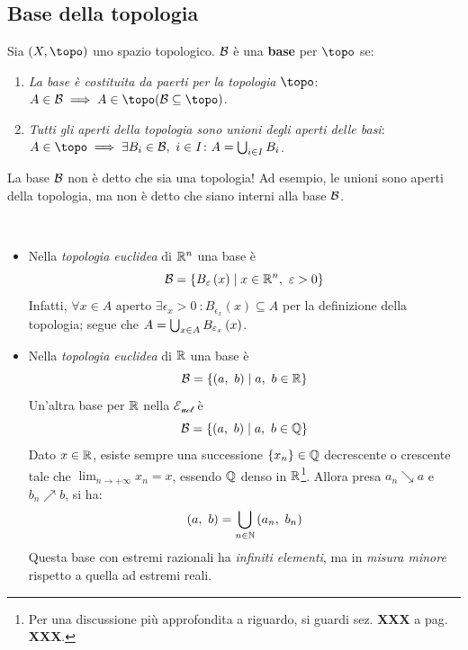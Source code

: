\subsection{Base della topologia}
\begin{define}
Sia $\left(X, \topo\right)$ uno spazio topologico. $\mathcal{B}$ è una \textbf{base} per $\topo$ se:
\begin{enumerate}
\item \textit{La base è costituita da paerti per la topologia $\topo$}: $A\in\basis\implies A\in\topo (\basis\subseteq\topo)$.
\item \textit{Tutti gli aperti della topologia sono unioni degli aperti delle basi}:
$A\in\topo\implies\exists B_i\in\basis,\ i\in I\colon A=\union_{i\in I}B_i$.
\end{enumerate}
\end{define}
\begin{attention}
La base $\mathcal{B}$ non è detto che sia una topologia! Ad esempio, le unioni sono aperti della topologia, ma non è detto che siano interni alla base $\mathcal{B}$.
\end{attention}
\begin{examples}~{}
\begin{itemize}
\item Nella \textit{topologia euclidea} di $\mathbb{R}^n$ una base è
\begin{equation}
\mathcal{B}=\left\{B_{\varepsilon}\left(x\right)\mid x\in\mathbb{R}^n,\ \varepsilon>0\right\}
\end{equation}
Infatti, $\forall x\in A$ aperto $\exists\epsilon_x>0\ \colon B_{\epsilon_x}\left(x\right)\subseteq A$ per la definizione della topologia; segue che $A=\mathop{{\bigcup}}\displaylimits_{x\in A}B_{\varepsilon_x}\left(x\right)$.
\item Nella \textit{topologia euclidea} di $\mathbb{R}$ una base è
\begin{equation}
	\mathcal{B}=\left\{\left(a,\ b\right)\mid a,\ b\in \mathbb{R}\right\}
\end{equation}
Un'altra base per $\mathbb{R}$ nella $\mathcal{E_{ucl}}$ è 
\begin{equation*}
	\basis=\left\{\left(a,\ b\right)\mid a,\ b\in \rationalset\right\}
\end{equation*}
Dato $x\in\mathbb{R}$, esiste sempre una successione $\left\{x_n\right\}\in\mathbb{Q}$ decrescente o crescente tale che $\displaystyle\lim_{n \to +\infty}x_n=x$, essendo $\mathbb{Q}$ denso in $\mathbb{R}$\footnote{Per una discussione più approfondita a riguardo, si guardi sez. \textbf{XXX} a pag. \textbf{XXX}.}. Allora presa $a_n\searrow a$ e $b_n\nearrow b$, si ha:
\begin{equation*}
\left(a,\ b\right)=\mathop{{\bigcup}}\displaylimits_{n\in \mathbb{N}}\left(a_n,\ b_n\right)
\end{equation*}
Questa base con estremi razionali ha \textit{infiniti elementi}, ma in \textit{misura minore} rispetto a quella ad estremi reali.
\end{itemize}
\end{examples}

